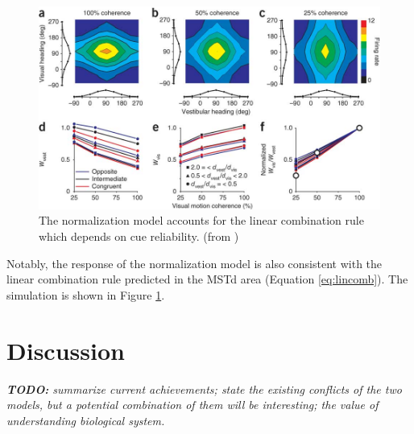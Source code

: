 \documentclass{article}[11pt]
\newcommand{\TODO}[1]{\emph{\small{{\bf TODO: } #1}}}
\begin{document}
\begin{figure}[tpb]
  \centering
  \includegraphics[width=.8\textwidth]{normweight}
  \caption{The normalization model accounts for the linear combination rule which depends on cue reliability. (from \cite{ohshiro_normalization_2011})}
  \label{fig:normweight}
\end{figure}

Notably, the response of the normalization model is also consistent with the linear combination rule predicted in the MSTd area (Equation \ref{eq:lincomb}). The simulation is shown in Figure \ref{fig:normweight}.

\section{Discussion}

\TODO{summarize current achievements; state the existing conflicts of the two models, but a potential combination of them will be interesting; the value of understanding biological system.}



\end{document}
